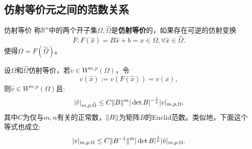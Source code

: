 \subsection{仿射等价元之间的范数关系}
\begin{definition}{仿射等价}
    称$\mathbb{R}^{n}$中的两个开子集$\Omega,\hat{\Omega}$是\textbf{仿射等价}的，如果存在可逆的仿射变换
    \begin{equation}
        F:F(\hat{x})=B\hat{x}+b=x\in\Omega,\forall\hat{x}\in\hat{\Omega}.
    \end{equation}
    使得$\Omega=F(\hat{\Omega})$。
\end{definition}
\begin{theorem}
    \label{thm:MAIN}
    设$\Omega$和$\hat{\Omega}$仿射等价，若$v\in W^{m,p}(\Omega)$，令
    \begin{equation}
        \hat{v}(\hat{x}):=v(F(\hat{x}))=v(x),
    \end{equation}
    则$\hat{v}\in W^{m,p}(\Omega)$且:
    \begin{equation}
        \label{eq:semiNormApprox1}
        |\hat{v}|_{m,p,\hat{\Omega}}\le C\|B\|^{m}|\det B|^{-\frac{1}{p}}|v|_{m,p,\Omega}.
    \end{equation}
    其中$C$为仅与$m,n$有关的正常数，$\|B\|$为矩阵$B$的Euclid范数。类似地，下面这个等式也成立:
    \begin{equation}
        \label{eq:semiNormApprox2}
        |v|_{m,p,\Omega}\le C\|B^{-1}\|^{m}|\det B|^{\frac{1}{p}}|\hat{v}|_{m,p,\Omega}.
    \end{equation}
\end{theorem}
